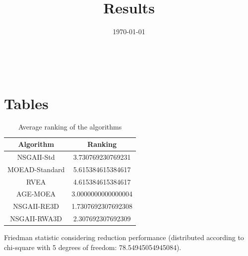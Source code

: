 \documentclass{article}
\title{Results}
\author{}
\date{\today}
\begin{document}
\oddsidemargin 0in \topmargin 0in\maketitle
\
\section{Tables}
\begin{table}[!htp]
\centering
\caption{Average ranking of the algorithms}
\begin{tabular}{c|c}
Algorithm&Ranking\\
\hline
NSGAII-Std&3.730769230769231\\
MOEAD-Standard&5.615384615384617\\
RVEA&4.615384615384617\\
AGE-MOEA&3.0000000000000004\\
NSGAII-RE3D&1.7307692307692308\\
NSGAII-RWA3D&2.307692307692309\\
\end{tabular}
\end{table}


Friedman statistic considering reduction performance (distributed according to chi-square with 5 degrees of freedom: 78.54945054945084).
\end{document}
